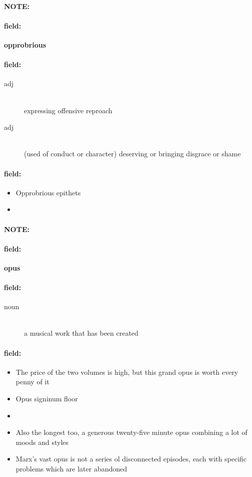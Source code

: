 \documentclass[12pt]{article}
\newenvironment{note}{\paragraph{NOTE:}}{}
\newenvironment{field}{\paragraph{field:}}{}
\begin{document}
\begin{note}
\begin{field}
\textbf{\large opprobrious}
\end{field}


\begin{field}
\begin{description}
\item[adj] \hfill \\ 
expressing offensive reproach

\item[adj] \hfill \\ 
(used of conduct or character) deserving or bringing disgrace or shame

\end{description}
\end{field}

\begin{field}
\begin{itemize}
\item Opprobrious epithets
\item 
\end{itemize}
\end{field}
\end{note}
\begin{note}
\begin{field}
\textbf{\large opus}
\end{field}


\begin{field}
\begin{description}
\item[noun] \hfill \\ 
a musical work that has been created

\end{description}
\end{field}

\begin{field}
\begin{itemize}
\item The price of the two volumes is high, but this grand opus is worth every penny of it
\item Opus signinum floor
\item 
\item Also the longest too, a generous twenty-five minute opus combining a lot of moods and styles
\item Marx's vast opus is not a series ol disconnected episodes, each with specific problems which are later abandoned
\end{itemize}
\end{field}
\end{note}
\end{document}
